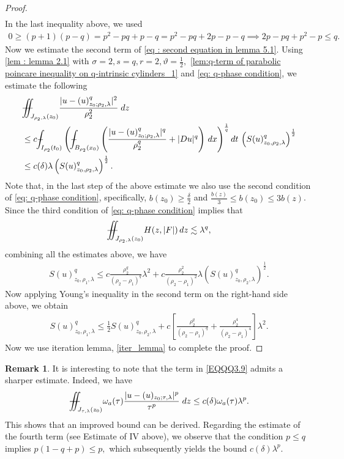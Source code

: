 \documentclass[11pt,oneside, english,reqno,twoside a4paper]{amsart}
\theoremstyle{definition}
\newtheorem{remark}{Remark}[section]
\numberwithin{theorem}{section}
\numberwithin{equation}{section}
\newcommand{\apprle}{\lesssim}
\def\Xint#1{\mathchoice
	{\XXint\displaystyle\textstyle{#1}}%
	{\XXint\textstyle\scriptstyle{#1}}%
	{\XXint\scriptstyle\scriptscriptstyle{#1}}%
	{\XXint\scriptscriptstyle\scriptscriptstyle{#1}}%
	\!\int}
\def\XXint#1#2#3{{\setbox0=\hbox{$#1{#2#3}{\int}$}
		\vcenter{\hbox{$#2#3$}}\kern-.50\wd0}}
\def\dashint{\Xint-}
\newcommand{\iintss}{{\int\hspace{-0.28cm}\int}}
\newcommand{ \miints }{{\iintss\hspace{-0.56cm} -\hspace{-0.15cm}-}}
\newcommand{\miint}[1]{{\miints_{\hspace{-0.13cm}#1}}}
\begin{document}
\begin{proof}
\begin{align*}
\end{align*}
In the last inequality above,  we used
\begin{align*}
    0\geq (p+1)(p-q)=p^2-pq+p-q=p^2-pq+2p-p-q\implies 2p-pq+p^2-p\leq q.
\end{align*}
Now we estimate the second term of \eqref{eq : second equation in lemma 5.1}. Using \cref{lem : lemma 2.1} with $\sigma =2, s=q, r=2, \vartheta=\frac{1}{2},$ \cref{lem:q-term of parabolic poincare inequality on q-intrinsic cylinders_1} and \cref{eq: q-phase condition}, we estimate the following
\begin{align*}
&\miint{J_{\rho_2,\lambda}(z_0)}\frac{|u-(u)^q_{z_0;\rho_2,\lambda}|^2}{\rho_2^2}\; dz \\
&\leq c\dashint_{I_{\rho_2}(t_0)}\left(\dashint_{B_{\rho_2}(x_0)}\left(\frac{|u-(u)^q_{z_0;\rho_2,\lambda}|^q}{\rho_2^q}+|Du|^q\right)\,dx\right)^{\frac{1}{q}}dt \, \left(S(u)^q_{z_0, \rho_2, \lambda}\right)^{\frac{1}{2}}\\
&\leq c (\delta)\lambda \left(S(u)^q_{z_0, \rho_2, \lambda}\right)^{\frac{1}{2}}.
\end{align*}
Note that, in the last step of the above estimate we also use the second condition of \eqref{eq: q-phase condition}, specifically, $b(z_0)\geq \frac{\delta}{2}$ and $\frac{b(z)}{3}\leq b(z_0)\leq 3b(z)$. Since the third condition of \eqref{eq: q-phase condition} implies that
\begin{align*}
    \miint{J_{\rho_2, \lambda}(z_0)}H(z, |F|)\, dz \apprle \lambda^q,
\end{align*}
combining all the estimates above, we have
\begin{align*}
    S(u)^q_{z_0, \rho_1, \lambda}\leq c\frac{\rho^q_2}{(\rho_2-\rho_1)^q}\lambda^2+c\frac{\rho^2_2}{(\rho_2-\rho_1)^2}\lambda \left(S(u)^q_{z_0, \rho_2, \lambda}\right)^{\frac{1}{2}}.
\end{align*}
Now applying Young's inequality in the second term on the right-hand side above, we obtain
\begin{align*}
S(u)^q_{z_0, \rho_1, \lambda}\leq \frac{1}{2} S(u)^q_{z_0, \rho_2, \lambda}+c\left[\frac{\rho^q_2}{(\rho_2-\rho_1)^q}+\frac{\rho^4_2}{(\rho_2-\rho_1)^4}\right] \lambda^2.
\end{align*}
Now we use iteration  lemma, \cref{iter_lemma} to complete the proof.
\end{proof}
\begin{remark}
It is interesting to note that the term in \eqref{EQQQ3.9} admits a sharper estimate. Indeed, we have
\begin{align*}
\miint{J_{\tau,\lambda}(z_0)}\omega_a(\tau)\frac{|u-(u)_{z_0;\tau,\lambda}|^{p}}{\tau^{p}}\; dz\leq c(\delta)\omega_a(\tau)\lambda^p.    
\end{align*}
This shows that an improved bound can be derived. Regarding the estimate of the fourth term (see Estimate of $\mathrm{IV}$ above), we observe that the condition $p\leq q$ implies $p(1-q+p)\leq p,$ which subsequently yields the bound $c(\delta)\lambda^p$.
\end{remark}
\end{document}
